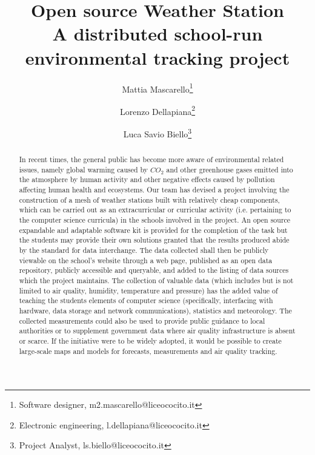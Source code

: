 \documentclass[12pt, a4paper]{article}
\title{Open source Weather Station\\\Large{A distributed school-run environmental tracking project}}
\author{Mattia Mascarello\thanks{Software designer, m2.mascarello@liceococito.it}\and Lorenzo Dellapiana\thanks{Electronic engineering, l.dellapiana@liceococito.it}\and Luca Savio Biello\thanks{Project Analyst, ls.biello@liceococito.it}}
\date{\parbox{\linewidth}{\centering%
		 \today\endgraf\bigskip
		Liceo Scientifico Statale ``Leonardo Cocito''}}
\begin{document}
	\maketitle
	
	\begin{abstract}
		In recent times, the general public has become more aware of environmental related issues, namely global warming caused by $CO_2$ and other greenhouse gases emitted into the atmosphere by human activity and other negative effects caused by pollution affecting human health and ecosystems.
		Our team has devised a project involving the construction of a mesh of weather stations built with relatively cheap components, which can be carried out as an extracurricular or curricular activity (i.e. pertaining to the computer science curricula) in the schools involved in the project.
		An open source expandable and adaptable software kit is provided for the completion of the task but the students may provide their own solutions granted that the results produced abide by the standard for data interchange.
		The data collected shall then be publicly viewable on the school's website through a web page, published as an open data repository, publicly accessible and queryable, and added to the listing of data sources which the project maintains.
		The collection of valuable data (which includes but is not limited to air quality, humidity, temperature and pressure) has the added value of teaching the students elements of computer science (specifically, interfacing with hardware, data storage and network communications), statistics and meteorology.
		The collected measurements could also be used to provide public guidance to local authorities or to supplement government data where air quality infrastructure is absent or scarce.
		If the initiative were to be widely adopted, it would be possible to create large-scale maps and models for forecasts, measurements and air quality tracking.
	\end{abstract}
	
\end{document}
